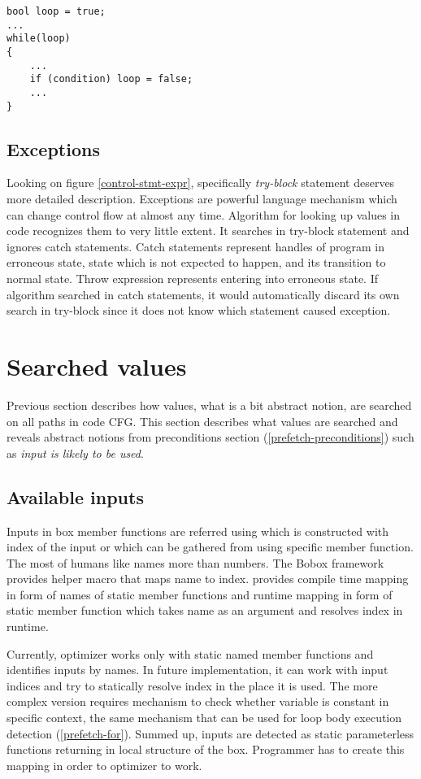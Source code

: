 \begin{lstlisting}[caption={Example of more complex loop with at least one body execution.}]
bool loop = true;
...
while(loop)
{
    ...
    if (condition) loop = false;
    ...
}
\end{lstlisting}

\subsection{Exceptions}
Looking on figure \ref{control-stmt-expr}, specifically \emph{try-block} statement deserves more detailed description. Exceptions are powerful language mechanism which can change control flow at almost any time. Algorithm for looking up values in code recognizes them to very little extent. It searches in try-block statement and ignores catch statements. Catch statements represent handles of program in erroneous state, state which is not expected to happen, and its transition to normal state. Throw expression represents entering into erroneous state. If algorithm searched in catch statements, it would automatically discard its own search in try-block since it does not know which statement caused exception.

\section{Searched values}
Previous section describes how values, what is a bit abstract notion, are searched on all paths in code CFG. This section describes what values are searched and reveals abstract notions from preconditions section (\ref{prefetch-preconditions}) such as \textit{input is likely to be used}.

\subsection{Available inputs}
Inputs in box member functions are referred using  which is constructed with index of the input or  which can be gathered from  using specific  member function. The most of humans like names more than numbers. The Bobox framework provides helper macro that maps name to index.  provides compile time mapping in form of names of static member functions and runtime mapping in form of static member function which takes name as an argument and resolves index in runtime.

Currently, optimizer works only with static named member functions and identifies inputs by names. In future implementation, it can work with input indices and try to statically resolve index in the place it is used. The more complex version requires mechanism to check whether variable is constant in specific context, the same mechanism that can be used for loop body execution detection (\ref{prefetch-for}). Summed up, inputs are detected as static parameterless functions returning  in local  structure of the box. Programmer has to create this mapping in order to optimizer to work.

